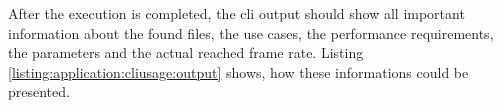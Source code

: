 

After the execution is completed, the \gls{cli} output should show all
important information about the found files, the use cases, the performance
requirements, the parameters and the actual reached frame rate. Listing
\ref{listing:application:cliusage:output} shows, how these informations could be
presented.



